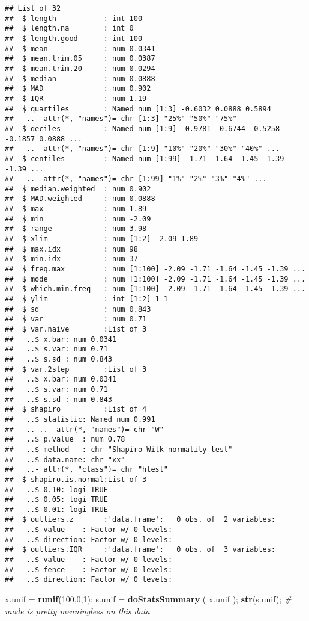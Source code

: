 \documentclass[
]{article}
\newenvironment{Shaded}{\begin{snugshade}}{\end{snugshade}}
\newcommand{\CommentTok}[1]{\textcolor[rgb]{0.56,0.35,0.01}{\textit{#1}}}
\newcommand{\DecValTok}[1]{\textcolor[rgb]{0.00,0.00,0.81}{#1}}
\newcommand{\KeywordTok}[1]{\textcolor[rgb]{0.13,0.29,0.53}{\textbf{#1}}}
\newcommand{\NormalTok}[1]{#1}
\newcommand{\StringTok}[1]{\textcolor[rgb]{0.31,0.60,0.02}{#1}}
\begin{document}
\begin{verbatim}
## List of 32
##  $ length           : int 100
##  $ length.na        : int 0
##  $ length.good      : int 100
##  $ mean             : num 0.0341
##  $ mean.trim.05     : num 0.0387
##  $ mean.trim.20     : num 0.0294
##  $ median           : num 0.0888
##  $ MAD              : num 0.902
##  $ IQR              : num 1.19
##  $ quartiles        : Named num [1:3] -0.6032 0.0888 0.5894
##   ..- attr(*, "names")= chr [1:3] "25%" "50%" "75%"
##  $ deciles          : Named num [1:9] -0.9781 -0.6744 -0.5258 -0.1857 0.0888 ...
##   ..- attr(*, "names")= chr [1:9] "10%" "20%" "30%" "40%" ...
##  $ centiles         : Named num [1:99] -1.71 -1.64 -1.45 -1.39 -1.39 ...
##   ..- attr(*, "names")= chr [1:99] "1%" "2%" "3%" "4%" ...
##  $ median.weighted  : num 0.902
##  $ MAD.weighted     : num 0.0888
##  $ max              : num 1.89
##  $ min              : num -2.09
##  $ range            : num 3.98
##  $ xlim             : num [1:2] -2.09 1.89
##  $ max.idx          : num 98
##  $ min.idx          : num 37
##  $ freq.max         : num [1:100] -2.09 -1.71 -1.64 -1.45 -1.39 ...
##  $ mode             : num [1:100] -2.09 -1.71 -1.64 -1.45 -1.39 ...
##  $ which.min.freq   : num [1:100] -2.09 -1.71 -1.64 -1.45 -1.39 ...
##  $ ylim             : int [1:2] 1 1
##  $ sd               : num 0.843
##  $ var              : num 0.71
##  $ var.naive        :List of 3
##   ..$ x.bar: num 0.0341
##   ..$ s.var: num 0.71
##   ..$ s.sd : num 0.843
##  $ var.2step        :List of 3
##   ..$ x.bar: num 0.0341
##   ..$ s.var: num 0.71
##   ..$ s.sd : num 0.843
##  $ shapiro          :List of 4
##   ..$ statistic: Named num 0.991
##   .. ..- attr(*, "names")= chr "W"
##   ..$ p.value  : num 0.78
##   ..$ method   : chr "Shapiro-Wilk normality test"
##   ..$ data.name: chr "xx"
##   ..- attr(*, "class")= chr "htest"
##  $ shapiro.is.normal:List of 3
##   ..$ 0.10: logi TRUE
##   ..$ 0.05: logi TRUE
##   ..$ 0.01: logi TRUE
##  $ outliers.z       :'data.frame':   0 obs. of  2 variables:
##   ..$ value    : Factor w/ 0 levels: 
##   ..$ direction: Factor w/ 0 levels: 
##  $ outliers.IQR     :'data.frame':   0 obs. of  3 variables:
##   ..$ value    : Factor w/ 0 levels: 
##   ..$ fence    : Factor w/ 0 levels: 
##   ..$ direction: Factor w/ 0 levels:
\end{verbatim}

\begin{Shaded}
\begin{Highlighting}[]
\NormalTok{x.unif =}\StringTok{ }\KeywordTok{runif}\NormalTok{(}\DecValTok{100}\NormalTok{,}\DecValTok{0}\NormalTok{,}\DecValTok{1}\NormalTok{);}
\NormalTok{s.unif =}\StringTok{ }\KeywordTok{doStatsSummary}\NormalTok{ ( x.unif );}
\KeywordTok{str}\NormalTok{(s.unif);  }\CommentTok{# mode is pretty meaningless on this data}
\end{Highlighting}
\end{Shaded}
\end{document}
